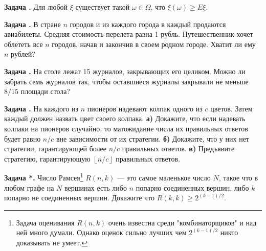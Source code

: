 \documentclass[11pt,a4paper]{article}
\newcounter{znum}
\newcommand{\z}[1]{\addtocounter{znum}{1} \textbf{Задача \arabic{znum}#1. }}
\renewcommand{\!}{\textcolor{red}{!}}
\begin{document}
\z{} Для любой $\xi$ существует такой $\omega \in \Omega$, что $\xi(\omega) \geqslant E\xi$.

\z{} В стране $n$ городов и из каждого города в каждый продаются авиабилеты. Средняя стоимость перелета равна 1 рубль. Путешественник хочет облететь все $n$ городов, начав и закончив в своем родном городе. Хватит ли ему $n$ рублей?

\z{} На столе лежат 15 журналов, закрывающих его целиком. Можно ли забрать семь журналов так, чтобы оставшиеся журналы закрывали не меньше $8/15$ площади стола?

\z{}  На каждого из $n$ пионеров надевают колпак одного из $c$ цветов. Затем каждый должен назвать цвет своего колпака. \textbf{а)} Докажите, что если надевать колпаки на пионеров случайно, то матожидание числа их правильных ответов будет равно $n/c$ вне зависимости от их стратегии.  \textbf{б)} Докажите, что у них нет стратегии, гарантирующей более $n/c$ правильных ответов. \textbf{в)} Предъявите стратегию, гарантирующую $ \left\lfloor n/c \right\rfloor$ правильных ответов.

\z{*} Число Рамсея\footnote{Задача оценивания $R(n,k)$ очень известна среди "комбинаторщиков" и над ней много думали. Однако оценок сильно лучших чем $2^{(k-1)/2}$ никто доказывать не умеет.} $R(n,k)$ --- это самое маленькое число $N$, такое что в любом графе на $N$ вершинах есть либо $n$ попарно соединенных вершин, либо $k$ попарно не соединенных вершин. Докажите что $R(k , k) \geqslant 2^{(k - 1)/2}$.
\end{document}
